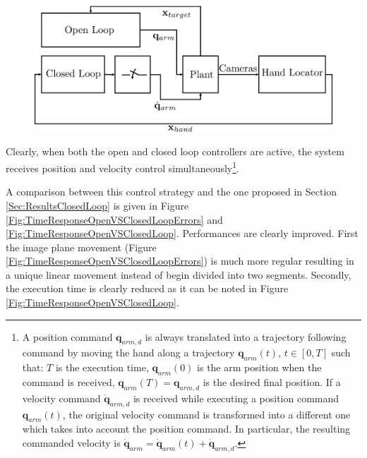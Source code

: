 \begin{figure}[th!]
\begin{center}
\includegraphics[scale = 0.25]{Figure/OpenVSClosedLoopSwitch.eps}
\end{center}
\end{figure}

Clearly, when both the open and closed loop controllers are active, the system receives position 
and velocity control simultaneously\footnote{A position command ${\mathbf q}_{arm,d}$ is 
always translated into a trajectory following command by moving 
the hand along a trajectory $\mathbf q_{arm}(t)$, $t \in [0, T]$ such that: $T$ is the execution time,
$\mathbf q_{arm}(0)$ is the arm position when the command is received, $\mathbf q_{arm}(T) = {\mathbf q}_{arm,d}$ is the desired final position. If a velocity command $\dot {\mathbf q}_{arm,d}$ is received while executing a position
command $\mathbf q_{arm}(t)$, the original velocity command is transformed into a different
one which takes into account the position command. In particular, the resulting commanded 
velocity is $\dot {\mathbf q}_{arm} = \dot {\mathbf q}_{arm}(t) + \dot {\mathbf q}_{arm, d}$.}. 

A comparison between this control strategy and the one proposed in Section \ref{Sec:ResultsClosedLoop}
is given in Figure \ref{Fig:TimeResponseOpenVSClosedLoopErrors} and \ref{Fig:TimeResponseOpenVSClosedLoop}. 
Performances are clearly improved. First the image plane movement (Figure \ref{Fig:TimeResponseOpenVSClosedLoopErrors})
is much more regular resulting in a unique linear movement instead of begin divided into two segments. Secondly, the
execution time is clearly reduced as it can be noted in Figure \ref{Fig:TimeResponseOpenVSClosedLoop}.

